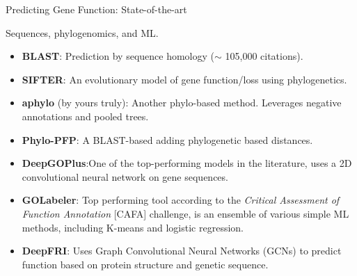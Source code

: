 \documentclass[10pt,aspectratio=169]{beamer}
\newcounter{frame}[frame]
\begin{document}
\begin{frame}{Predicting Gene Function: State-of-the-art}
	
	Sequences, phylogenomics, and ML.
	
	\begin{itemize}[<+->]
		\item \textbf{BLAST}\autocite{altschulBasicLocalAlignment1990}: Prediction by sequence homology ($\sim$ 105,000 citations).
		\item \textbf{SIFTER}\autocite{Engelhardt2005, Engelhardt2011}: An evolutionary model of gene function/loss using phylogenetics.
		\item \textbf{aphylo}\autocite{VegaYon2021} (by yours truly): Another phylo-based method. Leverages negative annotations and pooled trees.
		\item \textbf{Phylo-PFP}\autocite{Jain2019}: A BLAST-based adding phylogenetic based distances.
		\item \textbf{DeepGOPlus}\autocite{kulmanovDeepGOPlusImprovedProtein2019}:One of the top-performing models in the literature, uses a 2D convolutional neural network on gene sequences.
		\item \textbf{GOLabeler}\autocite{youGOLabelerImprovingSequencebased2018}: Top performing tool according to the \textit{Critical Assessment of Function Annotation} [CAFA] challenge\autocite{Zhou2019cafa}, is an ensemble of various simple ML methods, including K-means and logistic regression.
            \item \textbf{DeepFRI}\autocite{gligorijevicStructurebasedProteinFunction2021}: Uses Graph Convolutional Neural Networks (GCNs) to predict function based on protein structure and genetic sequence.
	\end{itemize}

	\vfil {}	
\end{frame}
\end{document}
